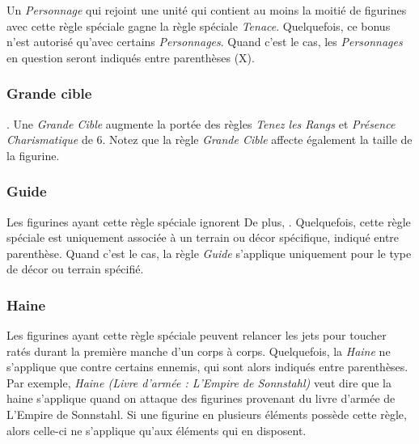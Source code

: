 \subsubsection*{}

Un \emph{Personnage} qui rejoint une unité qui contient au moins la moitié de figurines avec cette règle spéciale gagne la règle spéciale \emph{Tenace}. Quelquefois, ce bonus n'est autorisé qu'avec certains \emph{Personnages}. Quand c'est le cas, les \emph{Personnages} en question seront indiqués entre parenthèses (X).

\subsubsection*{Grande cible}

. Une \emph{Grande Cible} augmente la portée des règles \emph{Tenez les Rangs} et \emph{Présence Charismatique} de \unit{6}{\pouce}. Notez que la règle \emph{Grande Cible} affecte également la taille de la figurine.

\subsubsection*{Guide}

Les figurines ayant cette règle spéciale ignorent  De plus, . Quelquefois, cette règle spéciale est uniquement associée à un terrain ou décor spécifique, indiqué entre parenthèse. Quand c'est le cas, la règle \emph{Guide} s'applique uniquement pour le type de décor ou terrain spécifié.

\subsubsection*{Haine}

Les figurines ayant cette règle spéciale peuvent relancer les jets pour toucher ratés durant la première manche d'un corps à corps. Quelquefois, la \emph{Haine} ne s'applique que contre certains ennemis, qui sont alors indiqués entre parenthèses. Par exemple, \emph{Haine (Livre d'armée : L'Empire de Sonnstahl)} veut dire que la haine s'applique quand on attaque des figurines provenant du livre d'armée de L'Empire de Sonnstahl. Si une figurine en plusieurs éléments possède cette règle, alors celle-ci ne s'applique qu'aux éléments qui en disposent.

